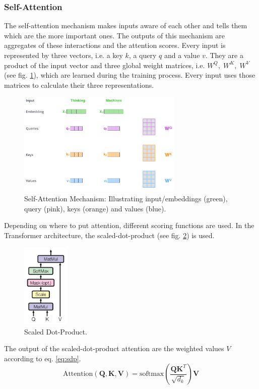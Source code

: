 \subsubsection{Self-Attention}
The self-attention mechanism \cite{vaswani2017attention} makes inputs aware of each other and tells them which are the more important ones. The outputs of this mechanism are aggregates of these interactions and the attention scores. Every input is represented by three vectors, i.e. a key $k$, a query $q$ and a value $v$. They are a product of the input vector and three global weight matrices, i.e. $W^Q,\;W^K,\;W^V$ (see fig. \ref{fig:selfattention}), which are learned during the training process. Every input uses those matrices to calculate their three representations.
\begin{figure}[H]
    \centering
    \includegraphics[width=0.7\textwidth]{figures/selfattention}
    \caption{Self-Attention Mechanism: Illustrating input/embeddings (green), query (pink), keys (orange) and values (blue). \cite{illustratedtransformer}}
    \label{fig:selfattention}
\end{figure}
Depending on where to put attention, different scoring functions are used. In the Transformer architecture, the scaled-dot-product (see fig. \ref{fig:scaled-dot-product-attention}) is used.
\begin{figure}[H]
    \centering
    \includegraphics[width=0.2\textwidth]{figures/scaled-dot-product-attention}
    \caption{Scaled Dot-Product. \cite{vaswani2017attention}}
    \label{fig:scaled-dot-product-attention}
\end{figure}
The output of the scaled-dot-product attention are the weighted values $V$ according to eq. \ref{eq:sdp}. 
\begin{equation}\label{eq:sdp}
    \text{Attention}(\mathbf{Q},\mathbf{K},\mathbf{V})=\text{softmax}\left(\frac{\mathbf{Q}\mathbf{K}^T}{\sqrt{d_k}}\right)\mathbf{V}
\end{equation}

